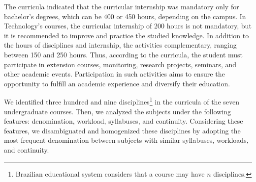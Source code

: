 \documentclass[sigconf, review]{educomp}
\begin{document}
The curricula indicated that the curricular internship was mandatory only for bachelor's degrees, which can be 400 or 450 hours, depending on the campus.
In Technology's courses, the curricular internship of 200 hours is not mandatory, but it is recommended to improve and practice the studied knowledge.
In addition to the hours of disciplines and internship, the activities
complementary, ranging between 150 and 250 hours.
Thus, according to the curricula, the student must participate in extension courses, monitoring, research projects, seminars, and other academic events.
Participation in such activities aims to ensure the opportunity to fulfill an academic experience and diversify their education.

We identified three hundred and nine disciplines\footnote{Brazilian educational system considers that a course may have $n$ disciplines.} in the curricula of the seven undergraduate courses.
Then, we analyzed the subjects under the following features: denomination, workload, syllabuses, and continuity.
Considering these features, we disambiguated and homogenized these disciplines by adopting the most frequent denomination between subjects with similar syllabuses, workloads, and continuity.
\end{document}
